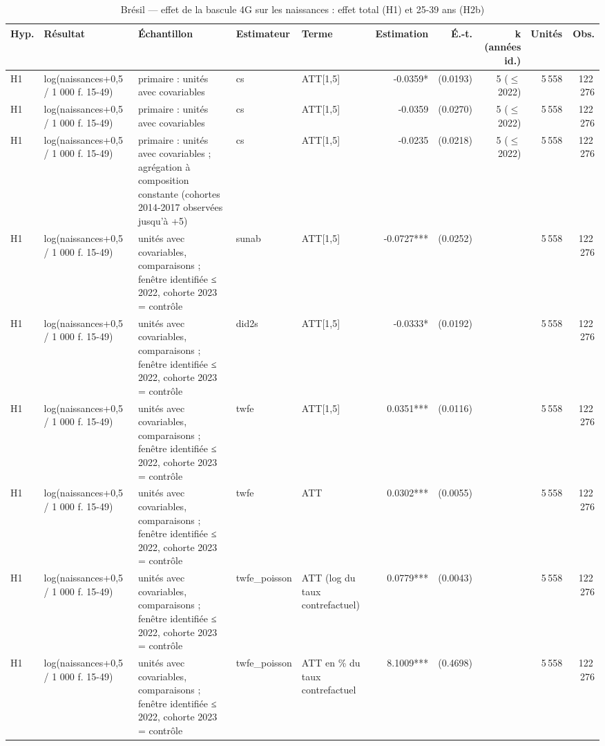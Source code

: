 \begin{table}\centering
\begin{threeparttable}
\caption{Brésil — effet de la bascule 4G sur les naissances : effet total (H1) et 25-39 ans (H2b)}\label{tab:br_main}
\scriptsize
\begin{tabular}{lp{3.8cm}p{6.5cm}lp{3.5cm}rrrrr}
\toprule
Hyp. & Résultat & Échantillon & Estimateur & Terme & Estimation & É.-t. & k (années id.) & Unités & Obs. \\
\midrule
H1 & log(naissances+0,5 / 1 000 f. 15-49) & primaire : unités avec covariables & cs & ATT[1,5] & -0.0359* & (0.0193) & 5 ($\leq$ 2022) & 5\,558 & 122\,276 \\
H1 & log(naissances+0,5 / 1 000 f. 15-49) & primaire : unités avec covariables & cs & ATT[1,5] & -0.0359 & (0.0270) & 5 ($\leq$ 2022) & 5\,558 & 122\,276 \\
H1 & log(naissances+0,5 / 1 000 f. 15-49) & primaire : unités avec covariables ; agrégation à composition constante (cohortes 2014-2017 observées jusqu'à +5) & cs & ATT[1,5] & -0.0235 & (0.0218) & 5 ($\leq$ 2022) & 5\,558 & 122\,276 \\
H1 & log(naissances+0,5 / 1 000 f. 15-49) & unités avec covariables, comparaisons ; fenêtre identifiée ≤ 2022, cohorte 2023 = contrôle & sunab & ATT[1,5] & -0.0727*** & (0.0252) &  & 5\,558 & 122\,276 \\
H1 & log(naissances+0,5 / 1 000 f. 15-49) & unités avec covariables, comparaisons ; fenêtre identifiée ≤ 2022, cohorte 2023 = contrôle & did2s & ATT[1,5] & -0.0333* & (0.0192) &  & 5\,558 & 122\,276 \\
H1 & log(naissances+0,5 / 1 000 f. 15-49) & unités avec covariables, comparaisons ; fenêtre identifiée ≤ 2022, cohorte 2023 = contrôle & twfe & ATT[1,5] & 0.0351*** & (0.0116) &  & 5\,558 & 122\,276 \\
H1 & log(naissances+0,5 / 1 000 f. 15-49) & unités avec covariables, comparaisons ; fenêtre identifiée ≤ 2022, cohorte 2023 = contrôle & twfe & ATT & 0.0302*** & (0.0055) &  & 5\,558 & 122\,276 \\
H1 & log(naissances+0,5 / 1 000 f. 15-49) & unités avec covariables, comparaisons ; fenêtre identifiée ≤ 2022, cohorte 2023 = contrôle & twfe\_poisson & ATT (log du taux contrefactuel) & 0.0779*** & (0.0043) &  & 5\,558 & 122\,276 \\
H1 & log(naissances+0,5 / 1 000 f. 15-49) & unités avec covariables, comparaisons ; fenêtre identifiée ≤ 2022, cohorte 2023 = contrôle & twfe\_poisson & ATT en \% du taux contrefactuel & 8.1009*** & (0.4698) &  & 5\,558 & 122\,276 \\

\end{tabular}
\end{threeparttable}
\end{table}
